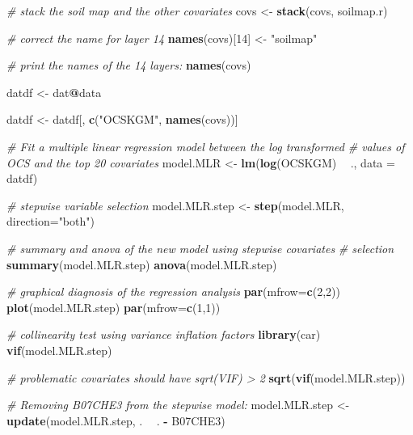 \documentclass[10pt,b5paper,]{book}
\newenvironment{Shaded}{\begin{snugshade}}{\end{snugshade}}
\newcommand{\CommentTok}[1]{\textcolor[rgb]{0.56,0.35,0.01}{\textit{#1}}}
\newcommand{\DataTypeTok}[1]{\textcolor[rgb]{0.13,0.29,0.53}{#1}}
\newcommand{\DecValTok}[1]{\textcolor[rgb]{0.00,0.00,0.81}{#1}}
\newcommand{\KeywordTok}[1]{\textcolor[rgb]{0.13,0.29,0.53}{\textbf{#1}}}
\newcommand{\NormalTok}[1]{#1}
\newcommand{\OperatorTok}[1]{\textcolor[rgb]{0.81,0.36,0.00}{\textbf{#1}}}
\newcommand{\StringTok}[1]{\textcolor[rgb]{0.31,0.60,0.02}{#1}}
\theoremstyle{definition}
\theoremstyle{definition}
\theoremstyle{definition}
\theoremstyle{remark}
\begin{document}
\begin{Shaded}
\begin{Highlighting}[]
\CommentTok{# stack the soil map and the other covariates}
\NormalTok{covs <-}\StringTok{ }\KeywordTok{stack}\NormalTok{(covs, soilmap.r)}

\CommentTok{# correct the name for layer 14}
\KeywordTok{names}\NormalTok{(covs)[}\DecValTok{14}\NormalTok{] <-}\StringTok{ "soilmap"}

\CommentTok{# print the names of the 14 layers:}
\KeywordTok{names}\NormalTok{(covs)}

\NormalTok{datdf <-}\StringTok{ }\NormalTok{dat}\OperatorTok{@}\NormalTok{data}

\NormalTok{datdf <-}\StringTok{ }\NormalTok{datdf[, }\KeywordTok{c}\NormalTok{(}\StringTok{"OCSKGM"}\NormalTok{, }\KeywordTok{names}\NormalTok{(covs))]}

\CommentTok{# Fit a multiple linear regression model between the log transformed}
\CommentTok{# values of OCS and the top 20 covariates}
\NormalTok{model.MLR <-}\StringTok{ }\KeywordTok{lm}\NormalTok{(}\KeywordTok{log}\NormalTok{(OCSKGM) }\OperatorTok{~}\StringTok{ }\NormalTok{., }\DataTypeTok{data =}\NormalTok{ datdf) }

\CommentTok{# stepwise variable selection}
\NormalTok{model.MLR.step <-}\StringTok{ }\KeywordTok{step}\NormalTok{(model.MLR, }\DataTypeTok{direction=}\StringTok{"both"}\NormalTok{)}

\CommentTok{# summary and anova of the new model using stepwise covariates }
\CommentTok{# selection}
\KeywordTok{summary}\NormalTok{(model.MLR.step)}
\KeywordTok{anova}\NormalTok{(model.MLR.step)}

\CommentTok{# graphical diagnosis of the regression analysis}
\KeywordTok{par}\NormalTok{(}\DataTypeTok{mfrow=}\KeywordTok{c}\NormalTok{(}\DecValTok{2}\NormalTok{,}\DecValTok{2}\NormalTok{)) }
\KeywordTok{plot}\NormalTok{(model.MLR.step)}
\KeywordTok{par}\NormalTok{(}\DataTypeTok{mfrow=}\KeywordTok{c}\NormalTok{(}\DecValTok{1}\NormalTok{,}\DecValTok{1}\NormalTok{))}

\CommentTok{# collinearity test using variance inflation factors}
\KeywordTok{library}\NormalTok{(car)}
\KeywordTok{vif}\NormalTok{(model.MLR.step)}

\CommentTok{# problematic covariates should have sqrt(VIF) > 2}
\KeywordTok{sqrt}\NormalTok{(}\KeywordTok{vif}\NormalTok{(model.MLR.step))}

\CommentTok{# Removing B07CHE3 from the stepwise model:}
\NormalTok{model.MLR.step <-}\StringTok{ }\KeywordTok{update}\NormalTok{(model.MLR.step, . }\OperatorTok{~}\StringTok{ }\NormalTok{. }\OperatorTok{-}\StringTok{ }\NormalTok{B07CHE3)}


\end{Highlighting}
\end{Shaded}
\end{document}
